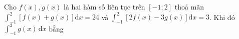 \begin{ex}
Cho $f(x),g(x)$ là hai hàm số liên tục trên $[-1;2]$ thoả mãn $\displaystyle\int_{-1}^{2}\left[f(x)+g(x)\right]\mathrm dx=24$ và $\displaystyle\int_{-1}^{2}\left[2f(x)-3g(x)\right]\mathrm dx=3$. Khi đó $\displaystyle\int_{-1}^{2}g(x)\,\mathrm dx$ bằng
\end{ex}
